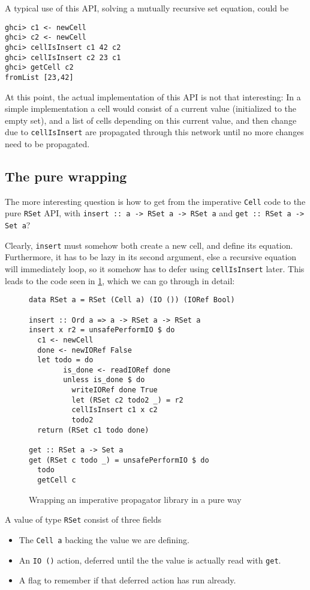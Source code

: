 \documentclass[manuscript,screen,acmsmall]{acmart}
\begin{document}
A typical use of this API, solving a mutually recursive set equation, could be
\begin{verbatim}
ghci> c1 <- newCell
ghci> c2 <- newCell
ghci> cellIsInsert c1 42 c2
ghci> cellIsInsert c2 23 c1
ghci> getCell c2
fromList [23,42]
\end{verbatim}

At this point, the actual implementation of this API is not that interesting: In a simple implementation a cell would consist of a current value (initialized to the empty set), and a list of cells depending on this current value, and then change due to \verb|cellIsInsert| are propagated through this network until no more changes need to be propagated.

\subsection{The pure wrapping}

The more interesting question is how to get from the imperative \verb|Cell| code to the pure \verb|RSet| API, with \verb|insert :: a -> RSet a -> RSet a| and \verb|get :: RSet a -> Set a|?

Clearly, \verb|insert| must somehow both create a new cell, and define its equation.
Furthermore, it has to be lazy in its second argument, else a recursive equation will immediately loop, so it somehow has to defer using \verb|cellIsInsert| later. This leads to the code seen in \cref{fig:wrap}, which we can go through in detail:

\begin{figure}
\begin{verbatim}
data RSet a = RSet (Cell a) (IO ()) (IORef Bool)

insert :: Ord a => a -> RSet a -> RSet a
insert x r2 = unsafePerformIO $ do
  c1 <- newCell
  done <- newIORef False
  let todo = do
        is_done <- readIORef done
        unless is_done $ do
          writeIORef done True
          let (RSet c2 todo2 _) = r2
          cellIsInsert c1 x c2
          todo2
  return (RSet c1 todo done)

get :: RSet a -> Set a
get (RSet c todo _) = unsafePerformIO $ do
  todo
  getCell c
\end{verbatim}
\caption{Wrapping an imperative propagator library in a pure way}\label{fig:wrap}
\end{figure}

A value of type \verb|RSet| consist of three fields
\begin{itemize}
\item The \verb|Cell a| backing the value we are defining.
\item An \verb|IO ()| action, deferred until the the value is actually read with \verb|get|.
\item A flag to remember if that deferred action has run already.
\end{itemize}
\end{document}
